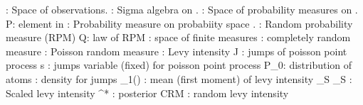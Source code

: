 




\X : Space of observations.
 : Sigma algebra on \X.
\probx: Space of probability measures on \X.
P: element in \probx
{} : Probability measure on probabiity space \probspace.
 : Random probability measure (RPM)
Q: law of RPM
\mb : space of finite measures
\tilde{\mu} : completely random measure
\N : Poisson random measure
\nu : Levy intensity
J : jumps of poisson point process
s : jumps variable (fixed) for poisson point process
P_0: distribution of atoms
\rho : density for jumps
\M_1(\nu) : mean (first moment) of levy intensity
\tilde{\mu}_S
\nu_S : Scaled levy intensity
\tilde{\mu}^* : posterior CRM
\tilde{\nu} : random levy intensity
